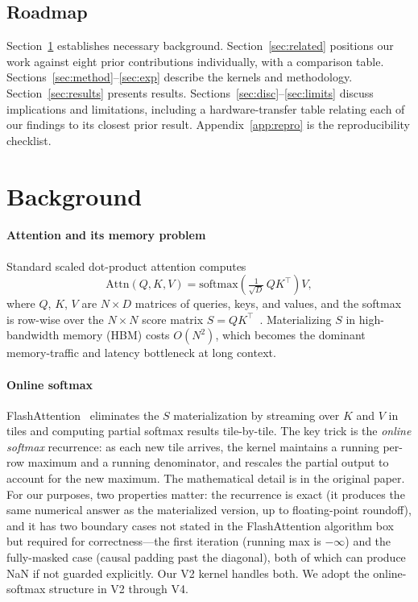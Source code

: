 \documentclass[conference]{IEEEtran}
\begin{document}
\subsection*{Roadmap}
Section~\ref{sec:bg} establishes necessary background.
Section~\ref{sec:related} positions our work against eight prior
contributions individually, with a comparison table.
Sections~\ref{sec:method}--\ref{sec:exp} describe the kernels and
methodology. Section~\ref{sec:results} presents results.
Sections~\ref{sec:disc}--\ref{sec:limits} discuss implications and
limitations, including a hardware-transfer table relating each of our
findings to its closest prior result.
Appendix~\ref{app:repro} is the reproducibility checklist.

\section{Background}
\label{sec:bg}

\paragraph*{Attention and its memory problem}
Standard scaled dot-product attention computes
\begin{equation}
\mathrm{Attn}(Q,K,V) = \mathrm{softmax}\!\left(\tfrac{1}{\sqrt{D}}\, Q K^\top\right) V,
\label{eq:attn}
\end{equation}
where $Q$, $K$, $V$ are $N \times D$ matrices of queries, keys, and
values, and the softmax is row-wise over the $N \times N$ score matrix
$S = QK^\top$~\cite{vaswani2017attention}. Materializing $S$ in
high-bandwidth memory (HBM) costs $O(N^2)$, which becomes the dominant
memory-traffic and latency bottleneck at long context.

\paragraph*{Online softmax}
FlashAttention~\cite{dao2022flashattention} eliminates the $S$
materialization by streaming over $K$ and $V$ in tiles and computing
partial softmax results tile-by-tile. The key trick is the
\emph{online softmax} recurrence: as each new tile arrives, the kernel
maintains a running per-row maximum and a running denominator, and
rescales the partial output to account for the new maximum. The
mathematical detail is in the original paper. For our purposes, two
properties matter: the recurrence is exact (it produces the same
numerical answer as the materialized version, up to floating-point
roundoff), and it has two boundary cases not stated in the
FlashAttention algorithm box but required for correctness---the first
iteration (running max is $-\infty$) and the fully-masked case
(causal padding past the diagonal), both of which can produce NaN if
not guarded explicitly. Our V2 kernel handles both. We adopt the
online-softmax structure in V2 through V4.
\end{document}
